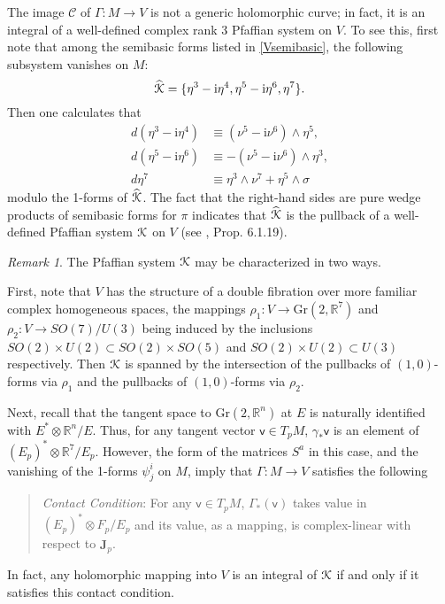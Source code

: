 \documentclass[12pt,reqno]{amsart}
\theoremstyle{definition}
\theoremstyle{remark}
\newtheorem{remark}[theorem]{Remark}
\begin{document}
The image ${\mathscr C}$ of $\Gamma:M \to V$ is not a generic holomorphic curve; in fact, it is an integral of a
well-defined complex rank 3 Pfaffian system on $V$.  To see this, first note that
 among the semibasic forms listed in \eqref{Vsemibasic}, the following
subsystem vanishes on $M$:
$${\widehat{{\EuScript K}}} = \{ \eta^3-{\mathrm i} \eta^4, \eta^5-{\mathrm i} \eta^6, \eta^7\}.$$
Then one calculates that
\begin{align*}
d(\eta^3-{\mathrm i} \eta^4) &\equiv (\nu^5 - {\mathrm i} \nu^6) {\wedge} \eta^5, \\
d(\eta^5-{\mathrm i} \eta^6) &\equiv -(\nu^5 - {\mathrm i} \nu^6){\wedge} \eta^3, \\
d\eta^7 &\equiv \eta^3 {\wedge} \nu^7 + \eta^5 {\wedge} \sigma
\end{align*}
modulo the 1-forms of ${\widehat{{\EuScript K}}}$.  The fact that the right-hand sides are pure wedge products
of semibasic forms for $\pi$ indicates that ${\widehat{{\EuScript K}}}$ is the pullback of a well-defined
Pfaffian system ${{\EuScript K}}$ on $V$ (see \cite{CFB}, Prop. 6.1.19).

\begin{remark}\label{charK} The Pfaffian system ${{\EuScript K}}$ may be characterized in two ways.

First, note that $V$ has the structure of a double fibration over more familiar complex homogeneous
spaces, the mappings $\rho_1: V \to {{\mathrm{Gr}}}(2,{\mathbb R}^7)$ and $\rho_2:V\to SO(7)/U(3)$ being
induced by the inclusions $SO(2)\times U(2) \subset SO(2)\times SO(5)$ and
$SO(2)\times U(2) \subset U(3)$ respectively.
Then ${{\EuScript K}}$ is spanned by the intersection of the pullbacks of
$(1,0)$-forms via $\rho_1$ and the pullbacks of $(1,0)$-forms via $\rho_2$.

Next, recall that the tangent space to ${{\mathrm{Gr}}}(2,{\mathbb R}^n)$ at $E$ is naturally
identified with $E^* \otimes {\mathbb R}^n/E$.  Thus, for any tangent vector ${\mathsf v}\in T_p M$,
$\gamma_* {\mathsf v}$ is an element of $(E_p)^* \otimes {\mathbb R}^7/E_p$.  However, the form of
the matrices $S^a$ in this case, and the vanishing of the 1-forms $\psi^i_j$ on $M$,
imply that $\Gamma: M \to V$ satisfies the following

\medskip
\begin{quote}
{\sl Contact Condition}:  For any ${\mathsf v}\in T_pM$, $\Gamma_*({\mathsf v})$ takes value in $(E_p)^* \otimes F_p/E_p$
and its value, as a mapping, is complex-linear with respect to ${\widehat{\mathbf J}}_p$.
\end{quote}

\medskip
\noindent
In fact, any holomorphic mapping into $V$ is an integral of ${{\EuScript K}}$ if and only if it satisfies
this contact condition.
\end{remark}
\end{document}
